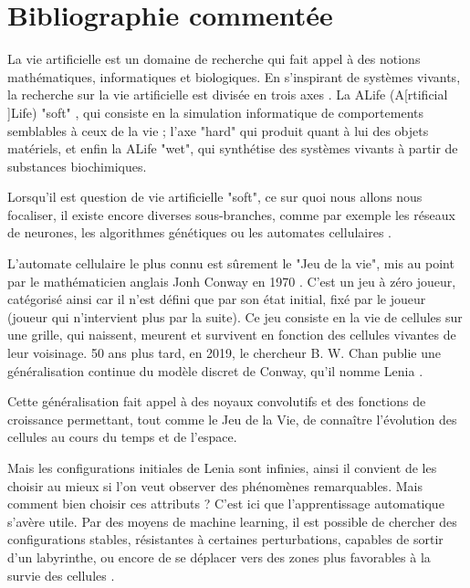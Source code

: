 \documentclass[a4paper, 11pt]{article}
\let\cite=\supercite
\begin{document}
\section*{Bibliographie comment\'ee}

La vie artificielle est un domaine de recherche qui fait appel à des notions
mathématiques, informatiques et biologiques. En s’inspirant de systèmes vivants, la 
recherche sur la vie artificielle est divisée en trois axes \cite{BEDAU2003505}. 
La ALife (A[rtificial ]Life) "soft" , qui consiste en la simulation informatique de 
comportements semblables à ceux de la vie ; l’axe "hard" qui produit quant à lui des 
objets matériels, et enfin la ALife "wet", qui synthétise des systèmes vivants à partir
de substances biochimiques.

Lorsqu’il est question de vie artificielle "soft", ce sur quoi nous allons nous 
focaliser, il existe encore diverses sous-branches, comme par exemple les réseaux de 
neurones, les algorithmes génétiques ou les automates 
cellulaires \cite{komosinski2009artificial}.

L’automate cellulaire le plus connu est sûrement le "Jeu de la vie", mis au point par 
le mathématicien anglais Jonh Conway en 1970 \cite{izhikevich2015game}. C’est un jeu à 
zéro joueur, catégorisé ainsi car il n’est défini que par son état initial, fixé par le
joueur (joueur qui n’intervient plus par la suite). Ce jeu consiste en la vie de 
cellules sur une grille, qui naissent, meurent et survivent en fonction des cellules 
vivantes de leur voisinage. 50 ans plus tard, en 2019, le chercheur B. W. Chan publie 
une généralisation continue du modèle discret de Conway, qu’il nomme
Lenia \cite{Chan_2019}.

Cette généralisation fait appel à des noyaux convolutifs et des fonctions de 
croissance \cite{Chan_2019} permettant, tout comme le Jeu de la Vie, de connaître 
l’évolution des cellules au cours du temps et de l’espace.

Mais les configurations initiales de Lenia sont infinies, ainsi il convient de les 
choisir au mieux si l’on veut observer des phénomènes remarquables. Mais comment bien 
choisir ces attributs ? C’est ici que l’apprentissage automatique s’avère utile. Par 
des moyens de machine learning, il est possible de chercher des configurations stables,
résistantes à certaines perturbations, capables de sortir d’un labyrinthe, ou encore de
se déplacer vers des zones plus favorables à la survie des cellules 
\cite{hamon:hal-03519319} \cite{plantec2023flowlenia}.
\end{document}
